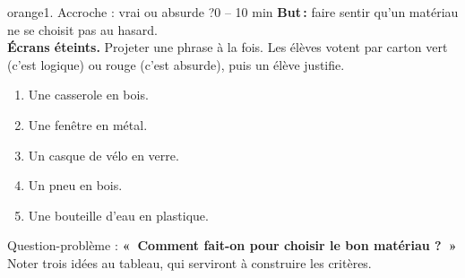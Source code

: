 \documentclass[11pt,a4paper]{article}
\begin{document}
\begin{etape}{orange}{1. Accroche : vrai ou absurde ?}{0 -- 10 min}
\textbf{But\,:} faire sentir qu'un matériau ne se choisit pas au hasard.\\
\textbf{Écrans éteints.} Projeter une phrase à la fois. Les élèves votent par carton vert (c'est logique) ou rouge (c'est absurde), puis un élève justifie.
\begin{enumerate}
 \item Une casserole en bois.
 \item Une fenêtre en métal.
 \item Un casque de vélo en verre.
 \item Un pneu en bois.
 \item Une bouteille d'eau en plastique.
\end{enumerate}
Question-problème : \textbf{«~Comment fait-on pour choisir le bon matériau ?~»} Noter trois idées au tableau, qui serviront à construire les critères.
\end{etape}
\end{document}
